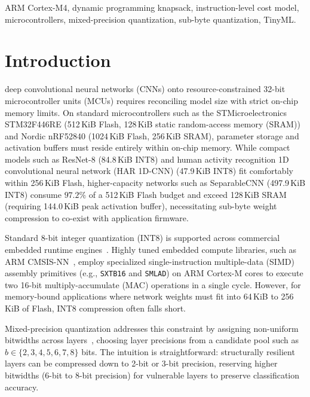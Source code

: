 \documentclass{ieeeaccess}
\begin{document}
\begin{keywords}
ARM Cortex-M4, dynamic programming knapsack, instruction-level cost model, microcontrollers, mixed-precision quantization, sub-byte quantization, TinyML.
\end{keywords}

\titlepgskip=-21pt

\maketitle

\section{Introduction}
\label{sec:intro}
 deep convolutional neural networks (CNNs) onto resource-constrained 32-bit microcontroller units (MCUs) requires reconciling model size with strict on-chip memory limits. On standard microcontrollers such as the STMicroelectronics STM32F446RE (512\,KiB Flash, 128\,KiB static random-access memory (SRAM)) and Nordic nRF52840 (1024\,KiB Flash, 256\,KiB SRAM), parameter storage and activation buffers must reside entirely within on-chip memory. While compact models such as ResNet-8 (84.8\,KiB INT8) and human activity recognition 1D convolutional neural network (HAR 1D-CNN) (47.9\,KiB INT8) fit comfortably within 256\,KiB Flash, higher-capacity networks such as SeparableCNN (497.9\,KiB INT8) consume $97.2\%$ of a 512\,KiB Flash budget and exceed 128\,KiB SRAM (requiring 144.0\,KiB peak activation buffer), necessitating sub-byte weight compression to co-exist with application firmware.

Standard 8-bit integer quantization (INT8) is supported across commercial embedded runtime engines~\cite{david2021tflm, lai2018cmsisnn}. Highly tuned embedded compute libraries, such as ARM CMSIS-NN~\cite{lai2018cmsisnn}, employ specialized single-instruction multiple-data (SIMD) assembly primitives (e.g., \texttt{SXTB16} and \texttt{SMLAD}) on ARM Cortex-M cores to execute two 16-bit multiply-accumulate (MAC) operations in a single cycle. However, for memory-bound applications where network weights must fit into 64\,KiB to 256\,KiB of Flash, INT8 compression often falls short.

Mixed-precision quantization addresses this constraint by assigning non-uniform bitwidths across layers~\cite{wang2019haq, dong2019hawq, dong2020hawqv2, yao2021hawqv3, rusci2020quantization, capotondi2020cmixnn}, choosing layer precisions from a candidate pool such as $b \in \{2, 3, 4, 5, 6, 7, 8\}$ bits. The intuition is straightforward: structurally resilient layers can be compressed down to 2-bit or 3-bit precision, reserving higher bitwidths (6-bit to 8-bit precision) for vulnerable layers to preserve classification accuracy.
\end{document}
